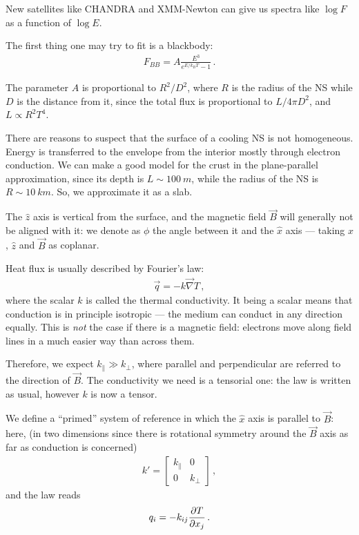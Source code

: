 \documentclass[main.tex]{subfiles}
\begin{document}
New satellites like CHANDRA and XMM-Newton can give us spectra like \(\log F\) as a function of \(\log E\).

The first thing one may try to fit is a blackbody: 
%
\begin{align}
F_{BB} = A \frac{E^3}{e^{E / k_B T} - 1}
\,.
\end{align}

The parameter \(A\) is proportional to \(R^2 / D^2\), where \(R\) is the radius of the NS while \(D\) is the distance from it, since
the total flux is proportional to \(L / 4 \pi D^2\), and \(L \propto R^2 T^{4}\).

There are reasons to suspect that the surface of a cooling NS is not homogeneous. 
Energy is transferred to the envelope from the interior mostly through electron conduction. 
We can make a good model for the crust in the plane-parallel approximation, since its depth is \(L \sim \SI{100}{m}\), while the radius of the NS is \(R \sim \SI{10}{km}\).
So, we approximate it as a slab.

The \(\hat{z}\) axis is vertical from the surface, and the magnetic field \(\vec{B}\) will generally not be aligned with it: we denote as \(\phi \) the angle between it and the \(\hat{x}\) axis --- taking \(\hat{x}\), \(\hat{z}\) and \(\vec{B}\) as coplanar. 

Heat flux is usually described by Fourier's law: 
%
\begin{align}
\vec{q} = - k \vec{\nabla} T
\,,
\end{align}
%
where the scalar \(k\) is called the thermal conductivity. 
It being a scalar means that conduction is in principle isotropic --- the medium can conduct in any direction equally.
This is \emph{not} the case if there is a magnetic field: electrons move along field lines in a much easier way than across them. 

Therefore, we expect \(k_\parallel \gg k_\perp\), where parallel and perpendicular are referred to the direction of \(\vec{B}\). 
The conductivity we need is a tensorial one: the law is written as usual, however \(k\) is now a tensor.

We define a ``primed'' system of reference in which the \(\hat{x}\) axis is parallel to \(\vec{B}\): here, (in two dimensions since there is rotational symmetry around the \(\vec{B}\) axis as far as conduction is concerned)
%
\begin{align}
k' = \left[\begin{array}{cc}
k_\parallel & 0 \\ 
0 & k_\perp
\end{array}\right]
\,,
\end{align}
%
and the law reads 
%
\begin{align}
q_i = - k_{ij} \pdv{T}{x_j}
\,.
\end{align}
\end{document}
